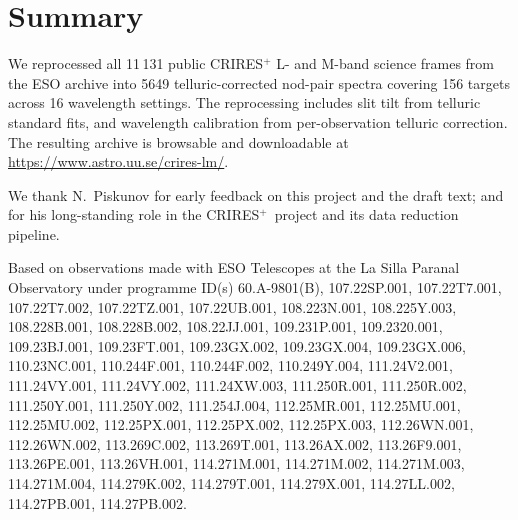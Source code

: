\documentclass{aa}
\newcommand{\crires}{CRIRES$^+$}
\begin{document}
\section{Summary}
\label{sec:summary}

We reprocessed all 11\,131 public \crires{} L- and M-band science
frames from the ESO archive into 5649 telluric-corrected nod-pair spectra
covering 156 targets across 16 wavelength settings. The reprocessing
includes slit tilt from telluric standard fits, and wavelength calibration
from per-observation telluric correction.
The resulting archive is browsable and downloadable at
\url{https://www.astro.uu.se/crires-lm/}.


\begin{acknowledgements}
We thank N.~Piskunov for early feedback on this project and the draft text; and for
his long-standing role in the \crires\ project and its data reduction pipeline.

Based on observations made with ESO Telescopes at the La Silla Paranal Observatory under programme ID(s)
60.A-9801(B),
107.22SP.001,
107.22T7.001,
107.22T7.002,
107.22TZ.001,
107.22UB.001,
108.223N.001,
108.225Y.003,
108.228B.001,
108.228B.002,
108.22JJ.001,
109.231P.001,
109.2320.001,
109.23BJ.001,
109.23FT.001,
109.23GX.002,
109.23GX.004,
109.23GX.006,
110.23NC.001,
110.244F.001,
110.244F.002,
110.249Y.004,
111.24V2.001,
111.24VY.001,
111.24VY.002,
111.24XW.003,
111.250R.001,
111.250R.002,
111.250Y.001,
111.250Y.002,
111.254J.004,
112.25MR.001,
112.25MU.001,
112.25MU.002,
112.25PX.001,
112.25PX.002,
112.25PX.003,
112.26WN.001,
112.26WN.002,
113.269C.002,
113.269T.001,
113.26AX.002,
113.26F9.001,
113.26PE.001,
113.26VH.001,
114.271M.001,
114.271M.002,
114.271M.003,
114.271M.004,
114.279K.002,
114.279T.001,
114.279X.001,
114.27LL.002,
114.27PB.001,
114.27PB.002.
\end{acknowledgements}




\end{document}
